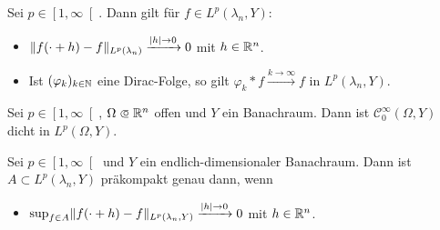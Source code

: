 \documentclass{cheat-sheet}
\newcommand{\convWith}[1]{\xrightarrow{#1 \to \infty}} %
\begin{document}
\begin{lem}
  Sei $p \in \left[ 1, \infty \right[$. Dann gilt für $f \in L^p(\lambda_n, Y)$:
  \begin{itemize}
    \item $\lVert f(\cdot + h) - f\rVert_{L^p(\lambda_n)} \xrightarrow{\lvert h\rvert \to 0} 0$ mit $h \in \mathbb{R}^n$.
    \item Ist $(\varphi_k)_{k \in \mathbb{N}}$ eine Dirac-Folge, so gilt $\varphi_k * f \convWith{k} f$ in $L^p(\lambda_n, Y)$.
  \end{itemize}
\end{lem}

\begin{satz}
  Sei $p \in \left[ 1, \infty \right[$, $\Omega \opn \R^n$ offen und $Y$ ein Banachraum. Dann ist $\mathcal{C}_0^\infty(\Omega, Y)$ dicht in $L^p(\Omega, Y)$.
\end{satz}


\begin{satz}[M. Riesz]
  Sei $p \in \left[ 1, \infty \right[$ und $Y$ ein endlich-dimensionaler Banachraum. Dann ist $A {\subset} L^p(\lambda_n, Y)$ präkompakt genau dann, wenn
  \begin{itemize}
    \item $\sup_{f \in A} \lVert f(\cdot + h) - f\rVert_{L^p(\lambda_n, Y)} \xrightarrow{\lvert h\rvert \to 0} 0$ mit $h \in \mathbb{R}^n$.
  \end{itemize}
\end{satz}

\end{document}
